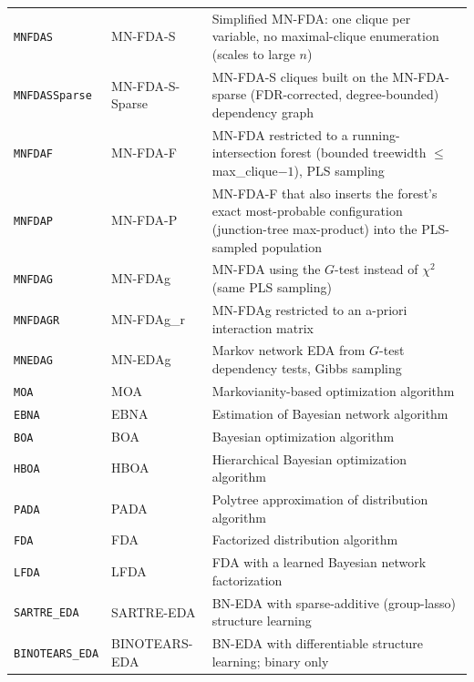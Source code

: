 \documentclass[a4paper,11pt]{article}
\begin{document}
\begin{table}[ht]
\begin{tabular}{llp{6.5cm}}
\texttt{MNFDAS} & MN-FDA-S & Simplified MN-FDA: one clique per variable, no maximal-clique enumeration (scales to large $n$) \citep{Santana:2003c} \\
\texttt{MNFDASSparse} & MN-FDA-S-Sparse & MN-FDA-S cliques built on the MN-FDA-sparse (FDR-corrected, degree-bounded) dependency graph \citep{Santana:2003c} \\
\texttt{MNFDAF} & MN-FDA-F & MN-FDA restricted to a running-intersection forest (bounded treewidth $\le$ max\_clique$-1$), PLS sampling \citep{Santana:2003c} \\
\texttt{MNFDAP} & MN-FDA-P & MN-FDA-F that also inserts the forest's exact most-probable configuration (junction-tree max-product) into the PLS-sampled population \citep{Santana:2003c} \\
\texttt{MNFDAG} & MN-FDAg & MN-FDA using the $G$-test instead of $\chi^2$ (same PLS sampling) \citep{Santana:2005} \\
\texttt{MNFDAGR} & MN-FDAg\_r & MN-FDAg restricted to an a-priori interaction matrix \citep{Santana:2005} \\
\texttt{MNEDAG} & MN-EDAg & Markov network EDA from $G$-test dependency tests, Gibbs sampling \citep{Santana:2005} \\
\texttt{MOA}  & MOA & Markovianity-based optimization algorithm \citep{Shakya_and_Santana:2008,Shakya_et_al:2011} \\
\texttt{EBNA} & EBNA & Estimation of Bayesian network algorithm \citep{Etxeberria_and_Larranhaga:1999} \\
\texttt{BOA}  & BOA & Bayesian optimization algorithm \citep{Pelikan_et_al:1999} \\
\texttt{HBOA}  & HBOA & Hierarchical Bayesian optimization algorithm \citep{Pelikan_and_Goldberg:2001,Pelikan:2005} \\
\texttt{PADA} & PADA & Polytree approximation of distribution algorithm \citep{Soto_et_al:1999,Ochoa_et_al:2000} \\
\texttt{FDA}  & FDA & Factorized distribution algorithm \citep{Muhlenbein_et_al:1999,Ochoa_et_al:1999} \\
\texttt{LFDA} & LFDA & FDA with a learned Bayesian network factorization \citep{Muhlenbein_and_Mahnig:1999} \\
\texttt{SARTRE\_EDA} & SARTRE-EDA & BN-EDA with sparse-additive (group-lasso) structure learning \citep{Kanamori_et_al:2026} \\
\texttt{BINOTEARS\_EDA} & BINOTEARS-EDA & BN-EDA with differentiable structure learning; binary only \citep{Deng_and_Aragam:2025} \\

\end{tabular}
\end{table}
\end{document}

